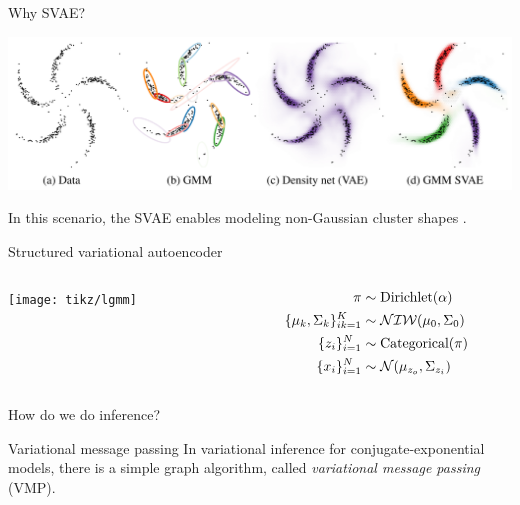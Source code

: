 \documentclass[10pt, compress]{beamer}
\begin{document}
\begin{frame}{Why SVAE?}

  \pause
  \begin{center}
    \includegraphics[frame,width=\textwidth]{img/svae-example}
  \end{center}

  \pause
  In this scenario, the SVAE enables modeling non-Gaussian cluster shapes \cite{svae}.
\end{frame}

\begin{frame}{Structured variational autoencoder}
  \centering
  \begin{columns}
    \begin{column}{0.3\textwidth}
      \texttt{[image: tikz/lgmm]}
    \end{column}
    \begin{column}{0.3\textwidth}
      \begin{align*}
        \pi &\sim \textrm{Dirichlet}(\alpha) \\
        \{\mu_k, \Sigma_k\}_{ik = 1}^K &\sim \mathcal{NIW}(\mu_0, \Sigma_0) \\
        \{z_i\}_{i = 1}^N &\sim \textrm{Categorical}(\pi) \\
        \{x_i\}_{i = 1}^N &\sim \mathcal{N}(\mu_{z_o}, \Sigma_{z_i})
      \end{align*}
    \end{column}
  \end{columns}
  \pause
  How do we do inference?
\end{frame}

\begin{frame}{Variational message passing}
  In variational inference for conjugate-exponential models,
  there is a simple graph algorithm, called \emph{variational message passing} (VMP).

  \begin{center}
  \end{center}

\end{frame}
\end{document}
